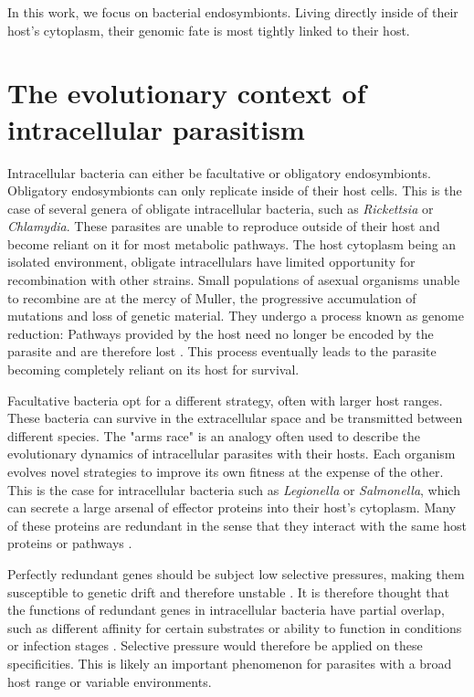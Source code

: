 In this work, we  focus on bacterial endosymbionts. Living directly inside of their host's cytoplasm, their genomic fate is most tightly linked to their host.

\section{The evolutionary context of intracellular parasitism}

Intracellular bacteria can either be facultative or obligatory endosymbionts. Obligatory endosymbionts can only replicate inside of their host cells. This is the case of several genera of obligate intracellular bacteria, such as \textit{Rickettsia} or \textit{Chlamydia}. These parasites are unable to reproduce outside of their host and become reliant on it for most metabolic pathways. The host cytoplasm being an isolated environment, obligate intracellulars have limited opportunity for recombination with other strains. Small populations of asexual organisms unable to recombine are at the mercy of \Gls{Muller}, the progressive accumulation of mutations and loss of genetic material. They undergo a process known as genome reduction: Pathways provided by the host need no longer be encoded by the parasite and are therefore lost \cite{McCutcheon2012}. This process eventually leads to the parasite becoming completely reliant on its host for survival.

Facultative bacteria opt for a different strategy, often with larger host ranges. These bacteria can survive in the extracellular space and be transmitted between different species. The "arms race" is an analogy often used to describe the evolutionary dynamics of intracellular parasites with their hosts. Each organism evolves novel strategies to improve its own fitness at the expense of the other. This is the case for intracellular bacteria such as \textit{Legionella} or \textit{Salmonella}, which can secrete a large arsenal of effector proteins into their host's cytoplasm. Many of these proteins are redundant in the sense that they interact with the same host proteins or pathways \cite{Ghosh2017}.

Perfectly redundant genes should be subject low selective pressures, making them susceptible to genetic drift and therefore unstable \cite{Bergthorsson2007}. It is therefore thought that the functions of redundant genes in intracellular bacteria have partial overlap, such as different affinity for certain substrates or ability to function in conditions or infection stages \cite{Ghosh2017}. Selective pressure would therefore be applied on these specificities. This is likely an important phenomenon for parasites with a broad host range or variable environments.

